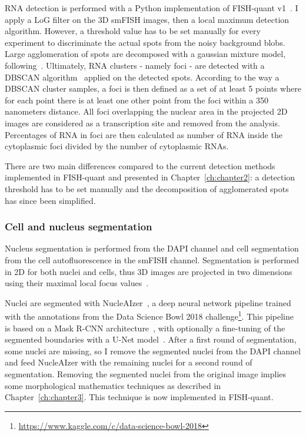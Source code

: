 \ac{RNA} detection is performed with a Python implementation of FISH-quant v1~\cite{mueller_fish-quant_2013}.
I apply a \ac{LoG} filter on the 3D \ac{smFISH} images, then a local maximum detection algorithm.
However, a threshold value has to be set manually for every experiment to discriminate the actual spots from the noisy background blobs.
Large agglomeration of spots are decomposed with a gaussian mixture model, following~\cite{samacoits_computational_2018}.
Ultimately, \ac{RNA} clusters - namely foci - are detected with a DBSCAN algorithm~\cite{ester_density-based_1996} applied on the detected spots.
According to the way a DBSCAN cluster samples, a foci is then defined as a set of at least 5 points where for each point there is at least one other point from the foci within a 350 nanometers distance.
All foci overlapping the nuclear area in the projected 2D images are considered as a transcription site and removed from the analysis.
Percentages of \ac{RNA} in foci are then calculated as number of \ac{RNA} inside the cytoplasmic foci divided by the number of cytoplasmic \ac{RNA}s.

There are two main differences compared to the current detection methods implemented in FISH-quant and presented in Chapter~\ref{ch:chapter2}: a detection threshold has to be set manually and the decomposition of agglomerated spots has since been simplified.

\subsubsection{Cell and nucleus segmentation}

Nucleus segmentation is performed from the DAPI channel and cell segmentation from the cell autofluorescence in the \ac{smFISH} channel.
Segmentation is performed in 2D for both nuclei and cells, thus 3D images are projected in two dimensions using their maximal local focus values~\cite{tsanov_smifish_2016}.

Nuclei are segmented with NucleAIzer~\cite{hollandi_nucleaizer_2020}, a deep neural network pipeline trained with the annotations from the Data Science Bowl 2018 challenge\footnote{\url{https://www.kaggle.com/c/data-science-bowl-2018}}.
This pipeline is based on a Mask R-CNN architecture~\cite{He_2017_ICCV}, with optionally a fine-tuning of the segmented boundaries with a U-Net model~\cite{Ronneberger_unet}.
After a first round of segmentation, some nuclei are missing, so I remove the segmented nuclei from the DAPI channel and feed NucleAIzer with the remaining nuclei for a second round of segmentation.
Removing the segmented nuclei from the original image implies some morphological mathematics techniques as described in Chapter~\ref{ch:chapter3}.
This technique is now implemented in FISH-quant.

